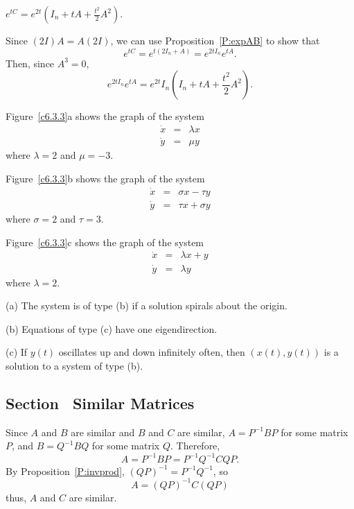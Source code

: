 \ans $e^{tC} = e^{2t}(I_n + tA + \frac{t^2}{2}A^2)$.

\soln Since $(2I)A = A(2I)$, we can use Proposition~\ref{P:expAB} to
show that
\[
e^{tC} = e^{t(2I_n + A)} = e^{2tI_n}e^{tA}.
\]
Then, since $A^3 = 0$,
\[
e^{2tI_n}e^{tA} = e^{2t}I_n(I_n + tA + \frac{t^2}{2}A^2).
\]

Figure~\ref{c6.3.3}a shows the graph of the system
\[ \begin{array}{rrr}
\dot{x} & = & \lambda x \\ 
\dot{y} & = & \mu y \end{array} \]
where $\lambda = 2$ and $\mu = -3$.

\para Figure~\ref{c6.3.3}b shows the graph of the system
\[ \begin{array}{rrr}
\dot{x} & = & \sigma x - \tau y \\
\dot{y} & = & \tau x + \sigma y \end{array} \]
where $\sigma = 2$ and $\tau = 3$.

\para Figure~\ref{c6.3.3}c shows the graph of the system
\[ \begin{array}{rrr}
\dot{x} & = & \lambda x + y \\
\dot{y} & = & \lambda y \end{array} \]
where $\lambda = 2$.

(a) The system is of type (b) if a solution spirals about the origin.

(b) Equations of type (c) have one eigendirection.

(c) If $y(t)$ oscillates up and down infinitely often, then
$(x(t),y(t))$ is a solution to a system of type (b).


\begin{figure}[htb]
                       \centerline{%
                       }
\end{figure}


\subsection*{Section~\protect{\ref{S:6.5}} Similar Matrices}

Since $A$ and $B$ are similar and $B$ and $C$ are similar,
$A = P^{-1}BP$ for some matrix $P$, and $B = Q^{-1}BQ$
for some matrix $Q$.  Therefore,
\[ A = P^{-1}BP = P^{-1}Q^{-1}CQP. \]
By Proposition~\ref{P:invprod}, $(QP)^{-1} = P^{-1}Q^{-1}$, so
\[ A = (QP)^{-1}C(QP) \]
thus, $A$ and $C$ are similar.

